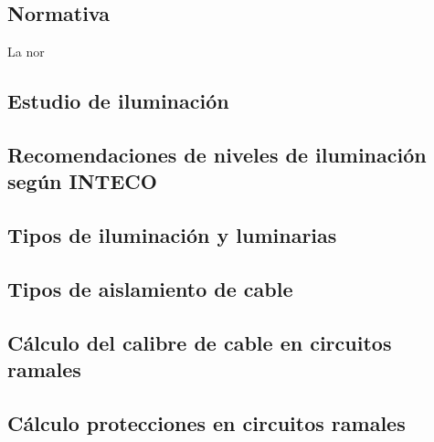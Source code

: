 \subsection{Normativa}

La nor

\subsection{Estudio de iluminación}

\subsection{Recomendaciones de niveles de iluminación según INTECO}

\subsection{Tipos de iluminación y luminarias}

\subsection{Tipos de aislamiento de cable}

\subsection{Cálculo del calibre de cable en circuitos ramales}

\subsection{Cálculo protecciones en circuitos ramales}

















